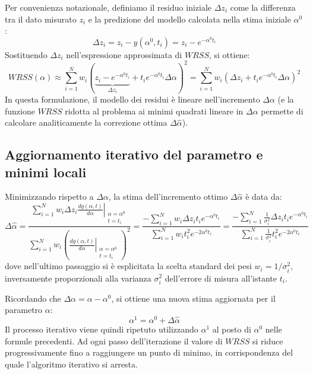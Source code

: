 Per convenienza notazionale, definiamo il residuo iniziale $\Delta z_{i}$ come la differenza tra il dato misurato $z_{i}$ e la predizione del modello calcolata nella stima iniziale $\alpha^{0}$:
\begin{equation}
\Delta z_{i} = z_{i} - y(\alpha^{0}, t_{i}) = z_{i} - e^{-\alpha^{0} t_{i}}
\end{equation}
Sostituendo $\Delta z_{i}$ nell'espressione approssimata di $WRSS$, si ottiene:
\begin{equation}
WRSS(\alpha) \approx \sum_{i=1}^{N} w_{i}\left(\underbrace{z_{i} - e^{-\alpha^{0} t_{i}}}_{\Delta z_{i}} + t_{i} e^{-\alpha^{0} t_{i}} \Delta\alpha\right)^{2} = \sum_{i=1}^{N} w_{i}\left(\Delta z_{i} + t_{i} e^{-\alpha^{0} t_{i}} \Delta\alpha\right)^{2}
\end{equation}
In questa formulazione, il modello dei residui è lineare nell'incremento $\Delta\alpha$ (e la funzione $WRSS$ ridotta al problema ai minimi quadrati lineare in $\Delta\alpha$ permette di calcolare analiticamente la correzione ottima $\Delta\hat{\alpha}$).

\subsection{Aggiornamento iterativo del parametro e minimi locali}

Minimizzando rispetto a $\Delta\alpha$, la stima dell'incremento ottimo $\Delta\hat{\alpha}$ è data da:
\begin{equation}
\Delta\hat{\alpha} = \frac{\sum_{i=1}^{N} w_{i} \Delta z_{i} \left.\frac{dg(\alpha, t)}{d\alpha}\right|_{\substack{\alpha=\alpha^{0} \\ t=t_{i}}}}{\sum_{i=1}^{N} w_{i} \left(\left.\frac{dg(\alpha, t)}{d\alpha}\right|_{\substack{\alpha=\alpha^{0} \\ t=t_{i}}}\right)^{2}} = \frac{-\sum_{i=1}^{N} w_{i} \Delta z_{i} t_{i} e^{-\alpha^{0} t_{i}}}{\sum_{i=1}^{N} w_{i} t_{i}^{2} e^{-2\alpha^{0} t_{i}}} = \frac{-\sum_{i=1}^{N} \frac{1}{\sigma_{i}^{2}} \Delta z_{i} t_{i} e^{-\alpha^{0} t_{i}}}{\sum_{i=1}^{N} \frac{1}{\sigma_{i}^{2}} t_{i}^{2} e^{-2\alpha^{0} t_{i}}}
\end{equation}
dove nell'ultimo passaggio si è esplicitata la scelta standard dei pesi $w_{i} = 1/\sigma_{i}^{2}$, inversamente proporzionali alla varianza $\sigma_{i}^{2}$ dell'errore di misura all'istante $t_{i}$.

Ricordando che $\Delta\alpha = \alpha - \alpha^{0}$, si ottiene una nuova stima aggiornata per il parametro $\alpha$:
\begin{equation}
\alpha^{1} = \alpha^{0} + \Delta\hat{\alpha}
\end{equation}
Il processo iterativo viene quindi ripetuto utilizzando $\alpha^{1}$ al posto di $\alpha^{0}$ nelle formule precedenti. Ad ogni passo dell'iterazione il valore di $WRSS$ si riduce progressivamente fino a raggiungere un punto di minimo, in corrispondenza del quale l'algoritmo iterativo si arresta.

